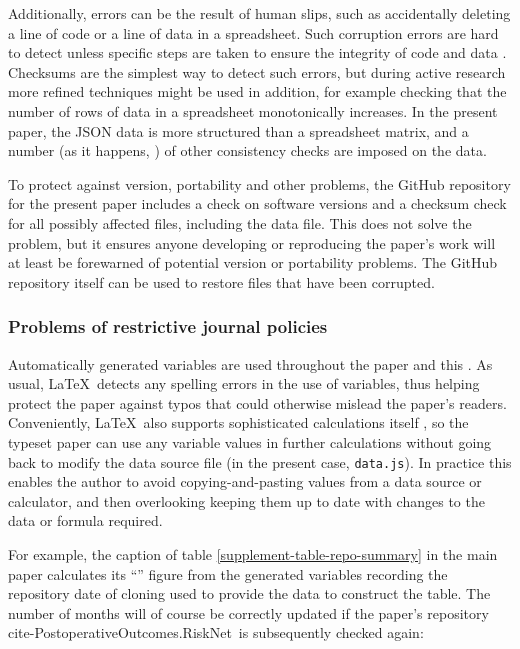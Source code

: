 \documentclass[10pt,a4paper]{article}
\begin{document}
Additionally, errors can be the result of human slips, such as accidentally deleting a line of code or a line of data in a spreadsheet. Such corruption errors are hard to detect unless specific steps are taken to ensure the integrity of code and data \cite{excel-fiasco}. Checksums are the simplest way to detect such errors, but during active research more refined techniques might be used in addition, for example checking that the number of rows of data in a spreadsheet monotonically increases. In the present paper, the JSON data is more structured than a spreadsheet matrix, and a number (as it happens, \the\JSONerrorCount) of other consistency checks are imposed on the data.

To protect against version, portability and other problems, the GitHub repository for the present paper includes a check on software versions and a checksum check for all possibly affected files, including the data file. This does not solve the problem, but it ensures anyone developing or reproducing the paper's work will at least be forewarned of potential version or portability problems. The GitHub repository itself can be used to restore files that have been corrupted.

\subsubsection{Problems of restrictive journal policies}
\label{supplement-restrictive-policies}
Automatically generated variables are used throughout the paper and this \supplement.
As usual, \LaTeX\ detects any spelling errors in the use of variables, thus helping protect the paper against typos that could otherwise mislead the paper's readers. Conveniently, \LaTeX\ also supports sophisticated calculations itself \cite{latex-calculus}, so the typeset paper can use any variable values in further calculations without going back to modify the data source file (in the present case, \texttt{data.js}). In practice this enables the author to avoid copying-and-pasting values from a data source or calculator, and then overlooking keeping them up to date with changes to the data or formula required.

For example, the caption of table \ref{supplement-table-repo-summary} in the main paper calculates its ``'' figure from the generated variables recording the repository date of cloning used to provide the data to construct the table. The number of months will of course be correctly updated if the paper's repository \csname cite-PostoperativeOutcomes.RiskNet\endcsname\ is subsequently checked again:
\end{document}
